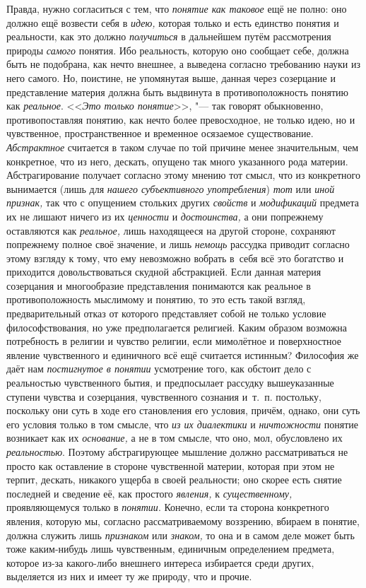 Правда, нужно согласиться с тем, что {\em понятие как таковое}
ещё не полно: оно должно ещё возвести себя в {\em идею,} которая
только и есть единство понятия и реальности, как это должно
{\em получиться} в дальнейшем путём рассмотрения природы
{\em самого} понятия. Ибо
реальность, которую оно сообщает себе, должна быть не подобрана, как нечто
внешнее, а выведена согласно требованию науки из него самого. Но, поистине,
не упомянутая выше, данная через созерцание и представление материя должна
быть выдвинута в противоположность понятию как {\em реальное}.
<<{\em Это только понятие}>>, "---
так говорят обыкновенно, противопоставляя понятию, как нечто
более превосходное, не только идею, но и чувственное, пространственное и
временное осязаемое существование. {\em Абстрактное}
считается в таком случае по той причине менее значительным,
чем конкретное, что из него, дескать, опущено так много указанного рода
материи. Абстрагирование получает согласно этому мнению тот смысл, что из
конкретного вынимается (лишь для {\em нашего субъективного
употребления}) {\em тот} или {\em иной признак,}
так что с опущением стольких других {\em свойств} и {\em модификаций}
предмета их не лишают ничего из их {\em ценности} и {\em достоинства,} а они
попрежнему оставляются как {\em реальное,} лишь находящееся на другой
стороне, сохраняют попрежнему полное своё значение, и лишь {\em немощь}
рассудка приводит согласно этому взгляду к тому, что ему
невозможно вобрать в~себя всё это богатство и приходится довольствоваться
скудной абстракцией. Если данная материя созерцания и многообразие
представления понимаются как реальное в противоположность мыслимому и
понятию, то это есть такой взгляд, предварительный отказ от которого
представляет собой не только условие философствования, но уже
предполагается религией. Каким образом возможна потребность в религии и
чувство религии, если мимолётное и поверхностное явление чувственного и
единичного всё ещё считается истинным? Философия же даёт нам
{\em постигнутое в понятии}
усмотрение того, как обстоит дело с реальностью чувственного
бытия, и предпосылает рассудку вышеуказанные ступени чувства и созерцания,
чувственного сознания и~т.~п. постольку, поскольку они суть
в ходе его становления его условия, причём, однако, они суть его условия
только в том смысле, что {\em из их диалектики} и
{\em ничтожности} понятие возникает как их {\em основание,}
а не в том смысле, что оно, мол, обусловлено их {\em реальностью}.
Поэтому абстрагирующее мышление должно рассматриваться не
просто как оставление в стороне чувственной материи, которая при этом не
терпит, дескать, никакого ущерба в своей реальности; оно скорее есть снятие
последней и сведение её, как простого {\em явления,} к {\em существенному,}
проявляющемуся только в {\em понятии}. Конечно,
если та сторона конкретного явления, которую мы, согласно рассматриваемому
воззрению, вбираем в понятие, должна служить лишь
{\em признаком} или {\em знаком,} то она и в
самом деле может быть тоже каким-нибудь лишь чувственным, единичным
определением предмета, которое из-за какого-либо внешнего интереса
избирается среди других, выделяется из них и имеет ту же природу, что и прочие.

